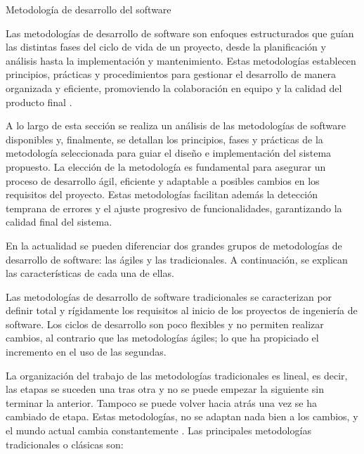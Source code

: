 \epigraph{Metodología de desarrollo del software}{
	
    Las metodologías de desarrollo de software son enfoques estructurados que guían las distintas fases del ciclo de vida de un proyecto, desde la planificación y análisis hasta la implementación y mantenimiento. Estas metodologías establecen principios, prácticas y procedimientos para gestionar el desarrollo de manera organizada y eficiente, promoviendo la colaboración en equipo y la calidad del producto final \citep{pacienzia2015metodologias}. 
    
    A lo largo de esta sección se realiza un análisis de las metodologías de software disponibles y, finalmente, se detallan los principios, fases y prácticas de la metodología seleccionada para guiar el diseño e implementación del sistema propuesto. La elección de la metodología es fundamental para asegurar un proceso de desarrollo ágil, eficiente y adaptable a posibles cambios en los requisitos del proyecto. Estas metodologías facilitan además la detección temprana de errores y el ajuste progresivo de funcionalidades, garantizando la calidad final del sistema.
    
    En la actualidad se pueden diferenciar dos grandes grupos de metodologías de desarrollo de software: las ágiles y las tradicionales. A continuación, se explican las características de cada una de ellas.
    
    
    Las metodologías de desarrollo de software tradicionales se caracterizan por definir total y rígidamente los requisitos al inicio de los proyectos de ingeniería de software. Los ciclos de desarrollo son poco flexibles y no permiten realizar cambios, al contrario que las metodologías ágiles; lo que ha propiciado el incremento en el uso de las segundas.
    
    La organización del trabajo de las metodologías tradicionales es lineal, es decir, las etapas se suceden una tras otra y no se puede empezar la siguiente sin terminar la anterior. Tampoco se puede volver hacia atrás una vez se ha cambiado de etapa. Estas metodologías, no se adaptan nada bien a los cambios, y el mundo actual cambia constantemente \citep{awad2005agile_v_traditional}. Las principales metodologías tradicionales o clásicas son:
    
}
